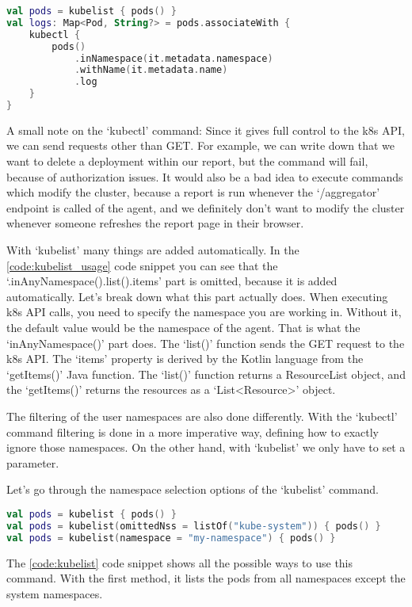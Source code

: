 \begin{lstlisting}[caption={Download pod logs},language=Kotlin,label=code:get_logs]
val pods = kubelist { pods() }
val logs: Map<Pod, String?> = pods.associateWith {
    kubectl {
        pods()
            .inNamespace(it.metadata.namespace)
            .withName(it.metadata.name)
            .log
    }
}
\end{lstlisting}

A small note on the `kubectl' command: Since it gives full control to the k8s API, we can send requests other than GET. For example, we can write down that we want to delete a deployment within our report, but the command will fail, because of authorization issues. It would also be a bad idea to execute commands which modify the cluster, because a report is run whenever the `/aggregator' endpoint is called of the agent, and we definitely don't want to modify the cluster whenever someone refreshes the report page in their browser.

With `kubelist' many things are added automatically. In the \ref{code:kubelist_usage} code snippet you can see that the `.inAnyNamespace().list().items' part is omitted, because it is added automatically. Let's break down what this part actually does. When executing k8s API calls, you need to specify the namespace you are working in. Without it, the default value would be the namespace of the agent. That is what the `inAnyNamespace()' part does. The `list()' function sends the GET request to the k8s API. The `items' property is derived by the Kotlin language from the `getItems()' Java function. The `list()' function returns a ResourceList object, and the `getItems()' returns the resources as a `List<Resource>' object.

The filtering of the user namespaces are also done differently. With the `kubectl' command filtering is done in a more imperative way, defining how to exactly ignore those namespaces. On the other hand, with `kubelist' we only have to set a parameter.

Let's go through the namespace selection options of the `kubelist' command.

\begin{lstlisting}[caption={Usages of kubelist},language=Kotlin,label=code:kubelist]
val pods = kubelist { pods() }
val pods = kubelist(omittedNss = listOf("kube-system")) { pods() }
val pods = kubelist(namespace = "my-namespace") { pods() }
\end{lstlisting}

The \ref{code:kubelist} code snippet shows all the possible ways to use this command. With the first method, it lists the pods from all namespaces except the system namespaces.

